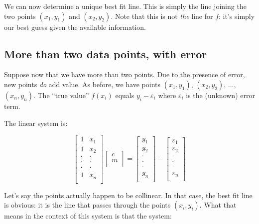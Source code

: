 \documentclass[10pt]{amsart}
\begin{document}
We can now determine a unique best fit line. This is simply the line
joining the two points $(x_1,y_1)$ and $(x_2,y_2)$. Note that this is
not {\em the} line for $f$: it's simply our best guess given the
available information.

\subsection{More than two data points, with error}

Suppose now that we have more than two points. Due to the presence of
error, new points {\em do} add value. As before, we have points
$(x_1,y_1)$, $(x_2,y_2)$, $\dots$, $(x_n,y_n)$. The ``true value''
$f(x_i)$ equals $y_i - \varepsilon_i$ where $\varepsilon_i$ is the (unknown) error term.

The linear system is:

$$\left[\begin{matrix} 1 & x_1 \\ 1 & x_2 \\ \cdot & \cdot \\ \cdot & \cdot \\ \cdot & \cdot \\ 1 & x_n \\\end{matrix}\right]\left[\begin{matrix} c \\ m \\\end{matrix}\right] = \left[\begin{matrix} y_1 \\ y_2 \\ \cdot \\ \cdot \\ \cdot \\ y_n \\\end{matrix}\right] - \left[\begin{matrix} \varepsilon_1 \\ \varepsilon_2 \\ \cdot \\ \cdot \\ \cdot \\ \varepsilon_n \\\end{matrix}\right]$$

Let's say the points actually happen to be collinear. In that case,
the best fit line is obvious: it is the line that passes through the
points $(x_i,y_i)$. What that means in the context of this system is
that the system:
\end{document}
